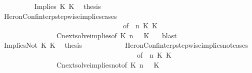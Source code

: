 \begin{isabellebody}
\isanewline
\ \ \ \ \ \ \ \ \isamarkupfalse%
\ {\isacharparenleft}Implies\ K{}\ K{}{\isacharparenright}\ \isamarkupfalse%
\ {\isacharquery}thesis\isanewline
\ \ \ \ \ \ \ \ \ \ \isamarkupfalse%
\ HeronConf{\isacharunderscore}interp{\isacharunderscore}stepwise{\isacharunderscore}implies{\isacharunderscore}cases\isanewline
\ \ \ \ \ \ \ \ \ \ \ \ \ \ \ \ \ \ \ \ \ \ \ \ \ \ \ \ \ \ \ \ \ \ \ {\isacharbrackleft}of\ {\isacartoucheopen}{\isasymGamma}{\isacartoucheclose}\ {\isacartoucheopen}n{\isacartoucheclose}\ {\isacartoucheopen}K{}{\isacartoucheclose}\ {\isacartoucheopen}K{}{\isacartoucheclose}\ {\isacartoucheopen}{\isasymPsi}{\isacartoucheclose}\ {\isacartoucheopen}{\isasymPhi}{\isacartoucheclose}{\isacharbrackright}\isanewline
\ \ \ \ \ \ \ \ \ \ \ \ \ \ \ \ Cnext{\isacharunderscore}solve{\isacharunderscore}implies{\isacharbrackleft}of\ {\isacartoucheopen}K{}{\isacartoucheclose}\ {\isacartoucheopen}n{\isacartoucheclose}\ {\isacartoucheopen}{\isasymGamma}{\isacartoucheclose}\ {\isacartoucheopen}{\isasymPsi}{\isacartoucheclose}\ {\isacartoucheopen}K{}{\isacartoucheclose}\ {\isacartoucheopen}{\isasymPhi}{\isacartoucheclose}{\isacharbrackright}\ \isamarkupfalse%
\ blast\isanewline
\ \ \ \ \ \ \isamarkupfalse%
\isanewline
\ \ \ \ \ \ \ \ \isamarkupfalse%
\ {\isacharparenleft}ImpliesNot\ K{}\ K{}{\isacharparenright}\ \isamarkupfalse%
\ {\isacharquery}thesis\isanewline
\ \ \ \ \ \ \ \ \ \ \isamarkupfalse%
\ HeronConf{\isacharunderscore}interp{\isacharunderscore}stepwise{\isacharunderscore}implies{\isacharunderscore}not{\isacharunderscore}cases\isanewline
\ \ \ \ \ \ \ \ \ \ \ \ \ \ \ \ \ \ \ \ \ \ \ \ \ \ \ \ \ \ \ \ \ \ \ \ \ \ \ {\isacharbrackleft}of\ {\isacartoucheopen}{\isasymGamma}{\isacartoucheclose}\ {\isacartoucheopen}n{\isacartoucheclose}\ {\isacartoucheopen}K{}{\isacartoucheclose}\ {\isacartoucheopen}K{}{\isacartoucheclose}\ {\isacartoucheopen}{\isasymPsi}{\isacartoucheclose}\ {\isacartoucheopen}{\isasymPhi}{\isacartoucheclose}{\isacharbrackright}\isanewline
\ \ \ \ \ \ \ \ \ \ \ \ \ \ \ \ Cnext{\isacharunderscore}solve{\isacharunderscore}implies{\isacharunderscore}not{\isacharbrackleft}of\ {\isacartoucheopen}K{}{\isacartoucheclose}\ {\isacartoucheopen}n{\isacartoucheclose}\ {\isacartoucheopen}{\isasymGamma}{\isacartoucheclose}\ {\isacartoucheopen}{\isasymPsi}{\isacartoucheclose}\ {\isacartoucheopen}K{}{\isacartoucheclose}\ {\isacartoucheopen}{\isasymPhi}{\isacartoucheclose}{\isacharbrackright}\ \isamarkupfalse%

\end{isabellebody}
